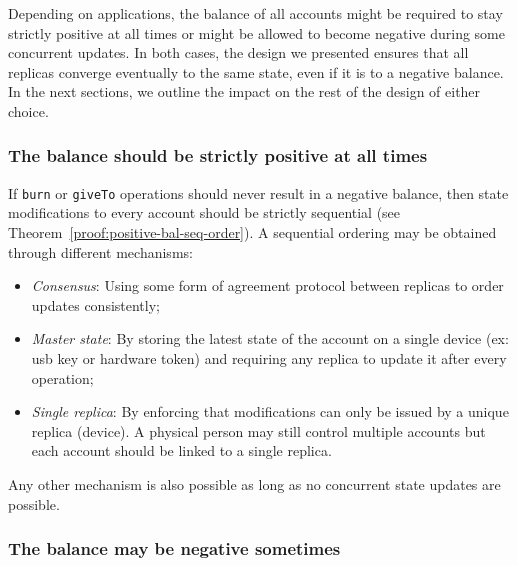 \documentclass[9pt, oneside]{article}   	%
\begin{document}
Depending on applications, the balance of all accounts might be required to stay strictly positive at all times or might be allowed to become negative during some concurrent updates. In both cases, the design we presented ensures that all replicas converge eventually to the same state, even if it is to a negative balance. In the next sections, we outline the impact on the rest of the design of either choice.

\subsubsection{The balance should be strictly positive at all times}

If \texttt{burn} or \texttt{giveTo} operations should never result in a negative balance, then state modifications to every account should be strictly sequential (see Theorem~\ref{proof:positive-bal-seq-order}). A sequential ordering may be obtained through different mechanisms:
\begin{itemize}
    \item \textit{Consensus}: Using some form of agreement protocol between replicas to order updates consistently;
    \item \textit{Master state}: By storing the latest state of the account on a single device (ex: usb key or hardware token) and requiring any replica to update it after every operation;
    \item \textit{Single replica}: By enforcing that modifications can only be issued by a unique replica (device). A physical person may still control multiple accounts but each account should be linked to a single replica.
\end{itemize}

Any other mechanism is also possible as long as no concurrent state updates are possible.

\subsubsection{The balance may be negative sometimes}
\end{document}
